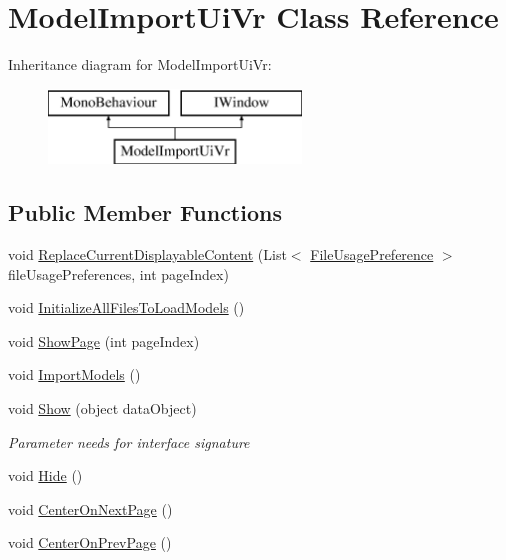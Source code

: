 \hypertarget{class_model_import_ui_vr}{}\section{Model\+Import\+Ui\+Vr Class Reference}
\label{class_model_import_ui_vr}
Inheritance diagram for Model\+Import\+Ui\+Vr\+:\begin{figure}[H]
\begin{center}
\leavevmode
\includegraphics[height=2.000000cm]{class_model_import_ui_vr}
\end{center}
\end{figure}
\subsection*{Public Member Functions}
\begin{DoxyCompactItemize}
\item 
void \mbox{\hyperlink{class_model_import_ui_vr_a1c6fd3cd664db5ab76ecc012d4b63d2d}{Replace\+Current\+Displayable\+Content}} (List$<$ \mbox{\hyperlink{class_file_usage_preference}{File\+Usage\+Preference}} $>$ file\+Usage\+Preferences, int page\+Index)
\item 
void \mbox{\hyperlink{class_model_import_ui_vr_a573f2274f78d0837383d52326aff5174}{Initialize\+All\+Files\+To\+Load\+Models}} ()
\item 
void \mbox{\hyperlink{class_model_import_ui_vr_a0f0039545cfe15bbea8f647c6173a9a2}{Show\+Page}} (int page\+Index)
\item 
void \mbox{\hyperlink{class_model_import_ui_vr_a9a755198e4567dc72ee904c92f6df3ad}{Import\+Models}} ()
\item 
void \mbox{\hyperlink{class_model_import_ui_vr_ac34967a5831f33b6afe216322e2909bb}{Show}} (object data\+Object)
\begin{DoxyCompactList}\small\item\em Parameter needs for interface signature \end{DoxyCompactList}\item 
void \mbox{\hyperlink{class_model_import_ui_vr_a20b68a74daa479ca9582518531871b77}{Hide}} ()
\item 
void \mbox{\hyperlink{class_model_import_ui_vr_a1a0afbc19ce40ac3365a73716075bcd4}{Center\+On\+Next\+Page}} ()
\item 
void \mbox{\hyperlink{class_model_import_ui_vr_a9aee36657340e839eae154bf9c4fdd22}{Center\+On\+Prev\+Page}} ()
\end{DoxyCompactItemize}
